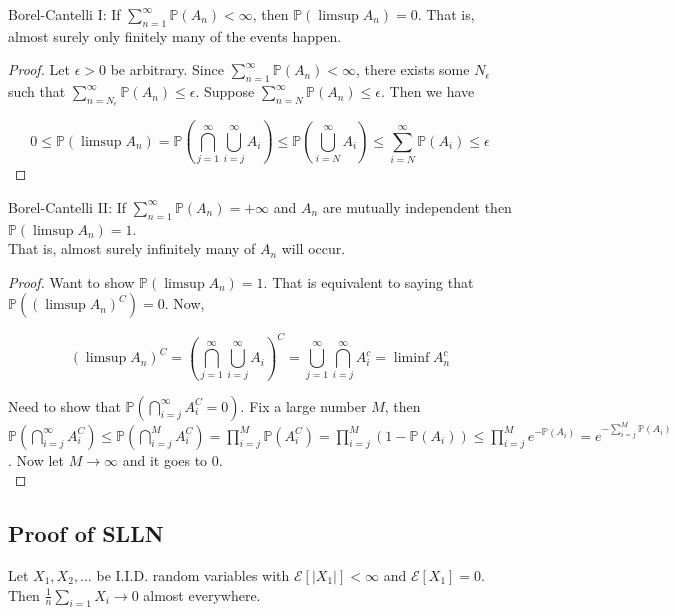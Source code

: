 \documentclass[english, course]{Notes}
\begin{document}
\begin{lemma}
Borel-Cantelli I: If $\sum_{n = 1}^\infty \mathbb{P}(A_n) < \infty$, then $\mathbb{P}(\limsup A_n) = 0$. That is, almost surely only finitely many of the events happen.
\end{lemma}

\begin{proof}
Let $\epsilon > 0$ be arbitrary. Since $\sum_{n = 1}^\infty \mathbb{P}(A_n) < \infty$, there exists some $N_\epsilon$ such that $\sum_{n = N_\epsilon}^\infty \mathbb{P}(A_n) \leq \epsilon$. Suppose $\sum_{n = N}^\infty \mathbb{P}(A_n) \leq \epsilon$. Then we have

\[0 \leq \mathbb{P}(\limsup A_n) = \mathbb{P}(\bigcap_{j=1}^\infty \bigcup_{i = j}^\infty A_i) \leq \mathbb{P} (\bigcup_{i = N}^\infty A_i) \leq \sum_{i = N}^\infty \mathbb{P}(A_i) \leq \epsilon\]
\end{proof}

\begin{lemma}
Borel-Cantelli II: If $\sum_{n=1}^\infty \mathbb{P}(A_n) = +\infty$ and $A_n$ are mutually independent then $\mathbb{P}(\limsup A_n) = 1$.\\

That is, almost surely infinitely many of $A_n$ will occur.
\end{lemma}

\begin{proof}
Want to show $\mathbb{P}(\limsup A_n) = 1$. That is equivalent to saying that $\mathbb{P}((\limsup A_n)^C) = 0$. Now,

\[(\limsup A_n)^C = (\bigcap_{j = 1}^\infty \bigcup_{i = j}^\infty A_i)^C = \bigcup_{j = 1}^\infty \bigcap_{i = j}^\infty A_i^c = \liminf A_n^c\]

Need to show that $\mathbb{P}(\bigcap_{i = j}^\infty A_i^C = 0)$. Fix a large number $M$, then $\mathbb{P}(\bigcap_{i=j}^\infty A_i^C) \leq \mathbb{P}(\bigcap_{i = j}^M A_i^C) = \prod_{i = j}^M \mathbb{P}(A_i^C) = \prod_{i = j}^M(1 - \mathbb{P}(A_i)) \leq \prod_{i = j}^M e^{-\mathbb{P}(A_i)} = e^{-\sum_{i = j}^M \mathbb{P}(A_i)}$. Now let $M \to \infty$ and it goes to $0$.\\
\end{proof}

\subsection{Proof of SLLN}

\begin{theorem}
Let $X_1, X_2, \dots$ be I.I.D. random variables with $\mathcal{E}[|X_1|] < \infty$ and $\mathcal{E}[X_1] = 0$. Then $\frac{1}{n} \sum_{i = 1}X_i \to 0$ almost everywhere.
\end{theorem}
\end{document}
